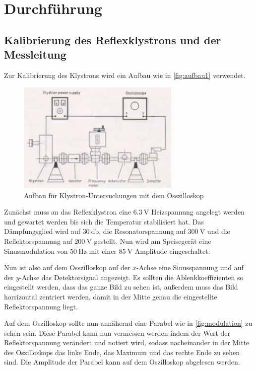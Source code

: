 \section{Durchführung}
\label{sec:Durchführung}

\subsection{Kalibrierung des Reflexklystrons und der Messleitung}
\label{ssec:Kalibrierung}

Zur Kalibrierung des Klystrons wird ein Aufbau wie in \autoref{fig:aufbau1} verwendet.

\begin{figure}
    \centering
    \includegraphics[width=0.7\textwidth]{images/aufbau1.png}
    \caption{Aufbau für Klystron-Untersuchungen mit dem Osszilloskop \cite{V53_old}}
    \label{fig:aufbau1}
\end{figure}

Zunächst muss an das Reflexklystron eine $\SI{6.3}{\volt}$ Heizspannung angelegt werden und gewartet werden bis sich die Temperatur stabilisiert hat.
Das Dämpfungsglied wird auf $\SI{30}{\decibel}$, die Resonatorspannung auf $\SI{300}{\volt}$ und die Reflektorspannung auf $\SI{200}{\volt}$ gestellt.
Nun wird am Speisegerät eine Sinusmodulation von $\SI{50}{\hertz}$ mit einer $\SI{85}{\volt}$ Amplitude eingeschaltet.

Nun ist also auf dem Osszilloskop auf der $x$-Achse eine Sinusspannung und auf der $y$-Achse das Detektorsignal angezeigt.
Es sollten die Ablenkkoeffizienten so eingestellt werden, dass das ganze Bild zu sehen ist, 
außerdem muss das Bild horrizontal zentriert werden, damit in der Mitte genau die eingestellte Reflektorspannung liegt.

Auf dem Oszilloskop sollte nun annähernd eine Parabel wie in \autoref{fig:modulation} zu sehen sein.
Diese Parabel kann nun vermessen werden indem der Wert der Reflektorspannung verändert und notiert wird, 
sodass nacheinander in der Mitte des Oszilloskops das linke Ende, das Maximum und das rechte Ende zu sehen sind.
Die Amplitude der Parabel kann auf dem Oszilloskop abgelesen werden.

